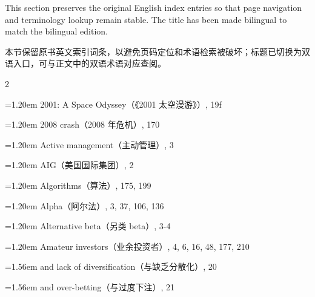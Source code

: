 
\begin{englishblock} This section preserves the original English index entries so that page navigation and terminology lookup remain stable. The title has been made bilingual to match the bilingual edition. \end{englishblock}

\begin{chineseblock} \noindent 本节保留原书英文索引词条，以避免页码定位和术语检索被破坏；标题已切换为双语入口，可与正文中的双语术语对应查阅。\end{chineseblock}

\medskip

{\footnotesize
\setlength{\parindent}{0pt} \setlength{\parskip}{0pt}

\begin{multicols}{2} \raggedright\raggedcolumns \setlength{\columnsep}{1.2em}
\par \noindent\hangindent=1.20em\hspace*{0.00em} 2001: A Space Odyssey（《2001 太空漫游》）, 19f
\par \noindent\hangindent=1.20em\hspace*{0.00em} 2008 crash（2008 年危机）, 170
\par \noindent\hangindent=1.20em\hspace*{0.00em} Active management（主动管理）, 3
\par \noindent\hangindent=1.20em\hspace*{0.00em} AIG（美国国际集团）, 2
\par \noindent\hangindent=1.20em\hspace*{0.00em} Algorithms（算法）, 175, 199
\par \noindent\hangindent=1.20em\hspace*{0.00em} Alpha（阿尔法）, 3, 37, 106, 136
\par \noindent\hangindent=1.20em\hspace*{0.00em} Alternative beta（另类 beta）, 3-4
\par \noindent\hangindent=1.20em\hspace*{0.00em} Amateur investors（业余投资者）, 4, 6, 16, 48, 177, 210
\par \noindent\hangindent=1.56em\hspace*{0.36em} and lack of diversification（与缺乏分散化）, 20
\par \noindent\hangindent=1.56em\hspace*{0.36em} and over-betting（与过度下注）, 21

\end{multicols}}
